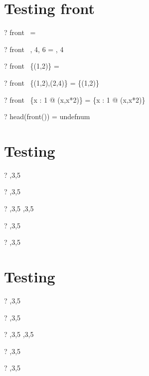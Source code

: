 \documentclass{article}
\begin{document}
\section{Testing front}
\begin{zed} \vdash? front~  \rangle = \emptyset \end{zed}
\begin{zed} \vdash? front~ , 4, 6 \rangle = , 4 \rangle \end{zed}
\begin{zed} \vdash? front~ \{(1,2)\} = \emptyset \end{zed}
\begin{zed} \vdash? front~ \{(1,2),(2,4)\} = \{(1,2)\} \end{zed}
\begin{zed} \vdash? front~ \{x : 1  @ (x,x*2)\} = \{x : 1  @ (x,x*2)\} \end{zed}
\begin{zed} \vdash? head(front(\emptyset[\num \cross \nat])) = undefnum \end{zed}


\section{Testing \prefix}
\begin{zed} \vdash? \langle \rangle  \prefix   {},3,5 \rangle \end{zed}
\begin{zed} \vdash?  \rangle  \prefix   {},3,5 \rangle \end{zed}
\begin{zed} \vdash? ,3,5 \rangle  \prefix   {},3,5 \rangle \end{zed}
\begin{zed} \vdash? \lnot {} \rangle  \prefix   {},3,5 \rangle \end{zed}
\begin{zed} \vdash? \lnot {} \rangle  \prefix   {},3,5 \rangle \end{zed}

\section{Testing \suffix}
\begin{zed} \vdash? \langle \rangle  \suffix   {},3,5 \rangle \end{zed}
\begin{zed} \vdash?  \rangle  \suffix   {},3,5 \rangle \end{zed}
\begin{zed} \vdash? ,3,5 \rangle  \suffix   {},3,5 \rangle \end{zed}
\begin{zed} \vdash? \lnot {} \rangle  \suffix   {},3,5 \rangle \end{zed}
\begin{zed} \vdash? \lnot {} \rangle  \suffix   {},3,5 \rangle \end{zed}
\end{document}
